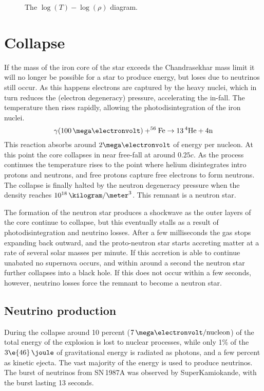 \begin{figure*}[t]
  \centering

  \caption{The $\log(T)-\log(\rho)$ diagram.}
  \label{fig:logTlogr}
\end{figure*}

\section{Collapse}
\label{sec:collapse}

If the mass of the iron core of the star exceeds the Chandrasekhar
mass limit it will no longer be possible for a star to produce energy,
but loses due to neutrinos still occur. As this happens electrons are
captured by the heavy nuclei, which in turn reduces the (electron
degeneracy) pressure, accelerating the in-fall. The temperature then
rises rapidly, allowing the photodisintegration of the iron nuclei.
\begin{equation}
  \label{eq:129}
  \gamma(100\,\mega\electronvolt) + ^{56}\ce{Fe} \to 13\, ^4\ce{He} + 4 \ce{n}
\end{equation}
This reaction absorbs around $2 \mega\electronvolt$ of energy per
nucleon. At this point the core collapses in near free-fall at around
$0.25 c$. As the process continues the temperature rises to the point
where helium disintegrates intro protons and neutrons, and free
protons capture free electrons to form neutrons. The collapse is
finally halted by the neutron degeneracy pressure when the density
reaches $10^{18}\,\kilogram/\meter^3$. This remnant is a neutron star.

The formation of the neutron star produces a shockwave as the outer
layers of the core continue to collapse, but this eventually stalls as
a result of photodisintegration and neutrino losses. After a few
milliseconds the gas stops expanding back outward, and the
proto-neutron star starts accreting matter at a rate of several solar
masses per minute. If this accretion is able to continue unabated no
supernova occurs, and within around a second the neutron star further
collapses into a black hole. If this does not occur within a few
seconds, however, neutrino losses force the remnant to become a
neutron star.

\subsection{Neutrino production}
\label{sec:neutrino-production}

During the collapse around 10 percent
($7\,\mega\electronvolt/\text{nucleon}$) of the total energy of the
explosion is lost to nuclear processes, while only 1\% of the
$3\e{46}\,\joule$ of gravitational energy is radiated as photons, and
a few percent as kinetic ejecta. The vast majority of the energy is
used to produce neutrinos. The burst of neutrinos from SN\,1987A was
observed by SuperKamiokande, with the burst lasting 13 seconds.

